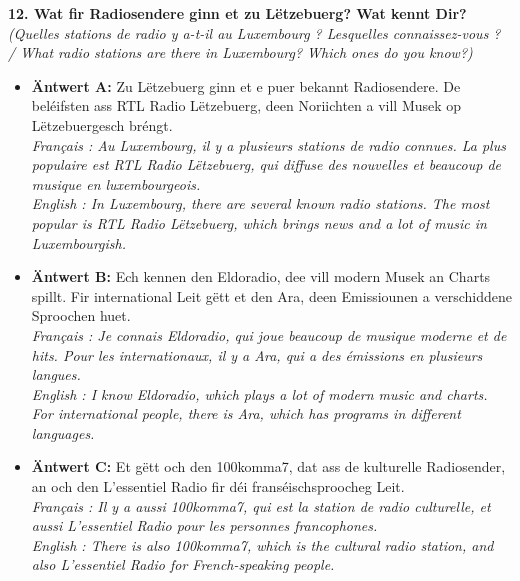 \noindent\textbf{12. Wat fir Radiosendere ginn et zu Lëtzebuerg? Wat kennt Dir?}\\
\textit{(Quelles stations de radio y a-t-il au Luxembourg ? Lesquelles connaissez-vous ? / What radio stations are there in Luxembourg? Which ones do you know?)}
\begin{itemize}
    \item \textbf{Äntwert A:} Zu Lëtzebuerg ginn et e puer bekannt Radiosendere. De beléifsten ass RTL Radio Lëtzebuerg, deen Noriichten a vill Musek op Lëtzebuergesch bréngt.\\
    \textit{Français : Au Luxembourg, il y a plusieurs stations de radio connues. La plus populaire est RTL Radio Lëtzebuerg, qui diffuse des nouvelles et beaucoup de musique en luxembourgeois.}\\
    \textit{English : In Luxembourg, there are several known radio stations. The most popular is RTL Radio Lëtzebuerg, which brings news and a lot of music in Luxembourgish.}
    \item \textbf{Äntwert B:} Ech kennen den Eldoradio, dee vill modern Musek an Charts spillt. Fir international Leit gëtt et den Ara, deen Emissiounen a verschiddene Sproochen huet.\\
    \textit{Français : Je connais Eldoradio, qui joue beaucoup de musique moderne et de hits. Pour les internationaux, il y a Ara, qui a des émissions en plusieurs langues.}\\
    \textit{English : I know Eldoradio, which plays a lot of modern music and charts. For international people, there is Ara, which has programs in different languages.}
    \item \textbf{Äntwert C:} Et gëtt och den 100komma7, dat ass de kulturelle Radiosender, an och den L'essentiel Radio fir déi franséischsproocheg Leit.\\
    \textit{Français : Il y a aussi 100komma7, qui est la station de radio culturelle, et aussi L'essentiel Radio pour les personnes francophones.}\\
    \textit{English : There is also 100komma7, which is the cultural radio station, and also L'essentiel Radio for French-speaking people.}
\end{itemize}
\vspace{0.5em}

